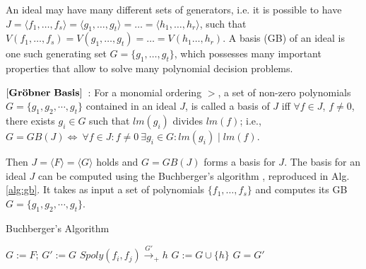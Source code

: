 An ideal may have many different sets of generators, i.e. it is
possible to have $J = \langle f_1, \dots, f_s\rangle = \langle g_1,
\dots, g_t \rangle = \dots = \langle h_1,\dots, h_r\rangle$, such that
$V(f_1,\dots,f_s)= V(g_1,\dots,g_t)=\dots=V(h_1\dots,h_r)$. A \Grobner
basis (GB) of an ideal is one such generating set $G=\{g_1, \dots,
g_t\}$, which possesses many important properties that allow to solve
many polynomial decision problems. 

\begin{Definition}
\label{def:gb}
$\bf{\left[Gr\ddot{o}bner\ Basis\right]}$~\cite{gb_book}: 
For a monomial ordering $>$, a set  of non-zero polynomials $G =
\{g_1,g_2,\cdots,g_t\}$ contained in an ideal $J$, is called a
\Grobner basis of $J$ iff 
$\forall f \in J$, $f\neq 0$, there exists $g_i\in G$ 
such that $lm(g_i)$ divides $lm(f)$; i.e., $G = GB(J)
\Leftrightarrow\  \forall f \in J : f \neq 0 \ \exists g_i \in G :
lm(g_i)\mid lm(f)$.  
\end{Definition}

Then $J = \langle F \rangle = \langle G \rangle$ holds and $G=GB(J)$
forms a basis for $J$. The \Grobner basis for an ideal $J$ can be
computed using the  Buchberger's algorithm \cite{buchberger_thesis},
reproduced in Alg. \ref{alg:gb}. 
It takes as input a set of polynomials $\{f_1,\dots, f_s\}$ and
computes its GB $G = \{g_1,g_2,\cdots,g_t\}$. 
\vspace{0.1in}
\begin{algorithm}
\caption {Buchberger's Algorithm}
\label{alg:gb}
\begin{algorithmic}[1]
  \State $G:= F$;
  \Repeat
    \State $G' := G$
      \State $Spoly(f_i, f_j) \stackrel{G'}{\textstyle\longrightarrow}_+h$ 
       \State $G:= G \cup \{h\}$ \EndIf
    \EndFor
  \Until $G = G'$
\end{algorithmic}
\end{algorithm}


